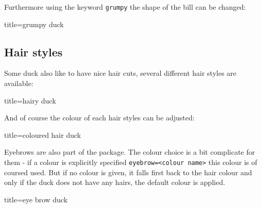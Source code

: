 \documentclass{ltxdockit}
\begin{document}
Furthermore using the keyword \texttt{grumpy} the shape of the bill can be changed:
\begin{tcblisting}{title={grumpy duck}}
\begin{tikzpicture}
	\duck[grumpy]
\end{tikzpicture}
\end{tcblisting}

\subsection{Hair styles}

Some duck also like to have nice hair cuts, several different hair styles are available:
\begin{tcblisting}{title={hairy duck}}
\begin{tikzpicture}
	\duck[longhair]
\end{tikzpicture}
\begin{tikzpicture}
	\duck[shorthair]
\end{tikzpicture}

\begin{tikzpicture}
	\duck[crazyhair]
\end{tikzpicture}
\begin{tikzpicture}
	\duck[recedinghair]
\end{tikzpicture}
\end{tcblisting}

And of course the colour of each hair styles can be adjusted:
\begin{tcblisting}{title={coloured hair duck}}
\begin{tikzpicture}
	\duck[longhair=teal]
\end{tikzpicture}
\end{tcblisting}

Eyebrows are also part of the package. The colour choice is a bit complicate for them - if a colour is explicitly specified \verb|eyebrow=<colour name>| this colour is of coursed used. But if no colour is given, it falls first back to the hair colour and only if the duck does not have any hairs, the default colour is applied.
\begin{tcblisting}{title={eye brow duck}}
\begin{tikzpicture}
	\duck[eyebrow]
\end{tikzpicture}
\begin{tikzpicture}
	\duck[longhair=blue, 
		eyebrow]
\end{tikzpicture}

\begin{tikzpicture}
	\duck[crazyhair=red, 
		eyebrow=blue]
\end{tikzpicture}
\end{tcblisting}
\end{document}
